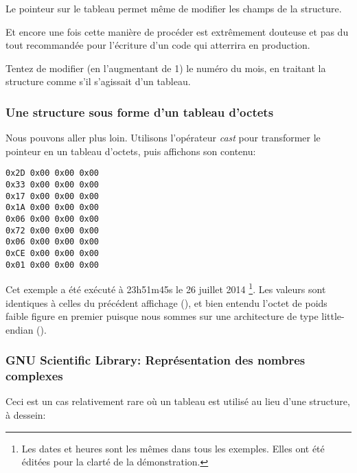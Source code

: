 Le pointeur sur le tableau permet même de modifier les champs de la structure.

Et encore une fois cette manière de procéder est extrêmement douteuse et pas du tout recommandée 
pour l'écriture d'un code qui atterrira en production.

\mysubparagraph{\Exercise}

Tentez de modifier (en l'augmentant de 1) le numéro du mois, en traitant la structure comme s'il 
s'agissait d'un tableau.

\subsubsection{Une structure sous forme d'un tableau d'octets}

Nous pouvons aller plus loin.
Utilisons l'opérateur \emph{cast} pour transformer le pointeur en un tableau d'octets, puis affichons 
son contenu:



\begin{lstlisting}
0x2D 0x00 0x00 0x00 
0x33 0x00 0x00 0x00 
0x17 0x00 0x00 0x00 
0x1A 0x00 0x00 0x00 
0x06 0x00 0x00 0x00 
0x72 0x00 0x00 0x00 
0x06 0x00 0x00 0x00 
0xCE 0x00 0x00 0x00 
0x01 0x00 0x00 0x00 
\end{lstlisting}

Cet exemple a été exécuté à 23h51m45s le 26 juillet 2014
\footnote{Les dates et heures sont les mêmes dans tous les exemples. Elles ont été éditées 
pour la clarté de la démonstration.}.
Les valeurs sont identiques à celles du précédent affichage (), et bien 
entendu l'octet de poids faible figure en premier puisque nous sommes sur une architecture de type 
little-endian ().



\iffalse
\subsubsection{GNU Scientific Library: Représentation des nombres complexes}

Ceci est un cas relativement rare où un tableau est utilisé au lieu d'une structure,
à dessein:

